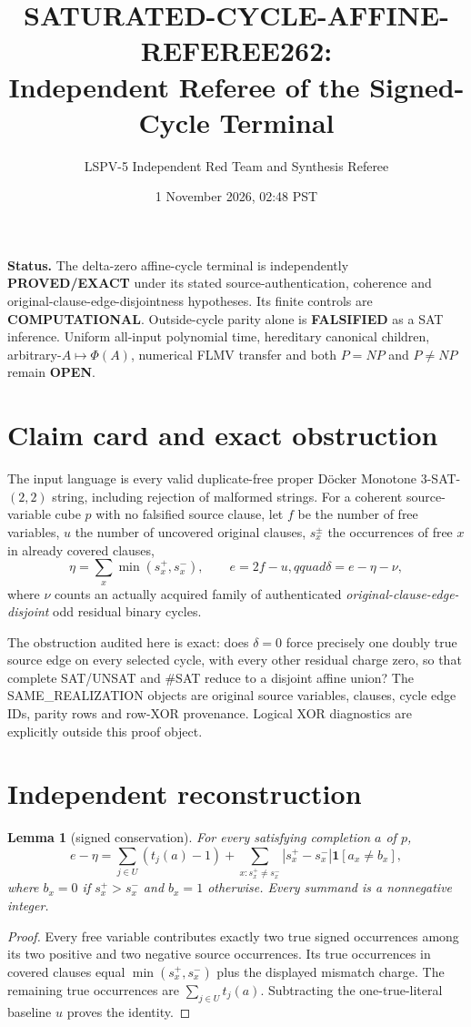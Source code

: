 \documentclass[11pt]{article}
\title{SATURATED-CYCLE-AFFINE-REFEREE262:\\Independent Referee of the Signed-Cycle Terminal}
\author{LSPV-5 Independent Red Team and Synthesis Referee}
\date{1 November 2026, 02:48 PST}
\newtheorem{lemma}{Lemma}
\begin{document}
\maketitle

\noindent\textbf{Status.} The delta-zero affine-cycle terminal is independently
\textbf{PROVED/EXACT} under its stated source-authentication, coherence and
original-clause-edge-disjointness hypotheses.  Its finite controls are
\textbf{COMPUTATIONAL}.  Outside-cycle parity alone is \textbf{FALSIFIED} as a
SAT inference.  Uniform all-input polynomial time, hereditary canonical
children, arbitrary-$A\mapsto\Phi(A)$, numerical FLMV transfer and both
$P=NP$ and $P\ne NP$ remain \textbf{OPEN}.

\section{Claim card and exact obstruction}
The input language is every valid duplicate-free proper D\"ocker Monotone
3-SAT-$(2,2)$ string, including rejection of malformed strings.  For a
coherent source-variable cube $p$ with no falsified source clause, let $f$ be
the number of free variables, $u$ the number of uncovered original clauses,
$s_x^\pm$ the occurrences of free $x$ in already covered clauses,
\[
 \eta=\sum_x\min(s_x^+,s_x^-),\qquad
 e=2f-u,qquad \delta=e-\eta-\nu,
\]
where $\nu$ counts an actually acquired family of authenticated
\emph{original-clause-edge-disjoint} odd residual binary cycles.

The obstruction audited here is exact: does $\delta=0$ force precisely one
doubly true source edge on every selected cycle, with every other residual
charge zero, so that complete SAT/UNSAT and \#SAT reduce to a disjoint affine
union?  The SAME\_REALIZATION objects are original source variables, clauses,
cycle edge IDs, parity rows and row-XOR provenance.  Logical XOR diagnostics
are explicitly outside this proof object.

\section{Independent reconstruction}
\begin{lemma}[signed conservation]
For every satisfying completion $a$ of $p$,
\[
 e-\eta=\sum_{j\in U}(t_j(a)-1)
 +\sum_{x:s_x^+\ne s_x^-}|s_x^+-s_x^-|
   \mathbf 1[a_x\ne b_x],
\]
where $b_x=0$ if $s_x^+>s_x^-$ and $b_x=1$ otherwise.
Every summand is a nonnegative integer.
\end{lemma}
\begin{proof}
Every free variable contributes exactly two true signed occurrences among its
two positive and two negative source occurrences.  Its true occurrences in
covered clauses equal $\min(s_x^+,s_x^-)$ plus the displayed mismatch charge.
The remaining true occurrences are $\sum_{j\in U}t_j(a)$.  Subtracting the
one-true-literal baseline $u$ proves the identity.
\end{proof}
\end{document}
